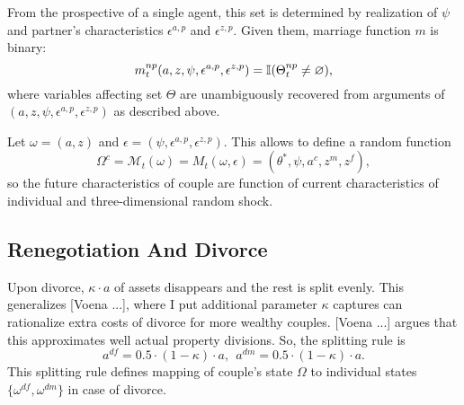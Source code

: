 From the prospective of a single agent, this set is determined by realization of $\psi$ and partner's characteristics $\epsilon^{a,p}$ and $\epsilon^{z,p}$. Given them, marriage function $m$ is binary:
\[m^{np}_t(a,z,\psi,\epsilon^{a,p},\epsilon^{z,p}) = \mathbb{I}(\Theta^{np}_t \neq \varnothing),\]
where variables affecting set $\Theta$ are unambiguously recovered from arguments of $(a,z,\psi,\epsilon^{a,p},\epsilon^{z,p})$ as described above.


Let $\omega = (a,z)$ and $\epsilon = (\psi,\epsilon^{a,p},\epsilon^{z,p})$. This allows to define a random function
\[\Omega^c = \mathcal{M}_t(\omega) = M_t(\omega,\epsilon) = (\theta^*,\psi,a^c,z^m,z^f),\]
so the future characteristics of couple are function of current characteristics of individual and three-dimensional random shock.
\subsection{Renegotiation And Divorce}

Upon divorce, $\kappa\cdot a$ of assets disappears and the rest is split evenly. This generalizes [Voena ...], where I put additional parameter $\kappa$ captures can rationalize extra costs of divorce for more wealthy couples. [Voena ...] argues that this approximates well actual property divisions. So, the splitting rule is
\[a^{df} = 0.5\cdot (1-\kappa)\cdot a,  \ \ a^{dm} = 0.5\cdot (1-\kappa)\cdot a.\]
This splitting rule defines mapping of couple's state $\Omega$ to individual states $\{\omega^{df},\omega^{dm}\}$ in case of divorce. 

